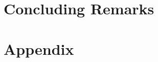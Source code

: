 \documentclass[ twoside,openright,titlepage,numbers=noenddot,%
                headinclude,footinclude,cleardoublepage=empty,abstract=on,
                BCOR=5mm,paper=b5,fontsize=11pt,
		dvipsnames
                ]{scrbook}
\begin{document}
\part{Concluding Remarks}
\cleardoublepage
\appendix
\part{Appendix}

\backmatter
\begingroup
\setlength{\bibitemsep}{1ex}
\cleardoublepage
\endgroup
\cleardoublepage
\cleardoublepage
\end{document}
